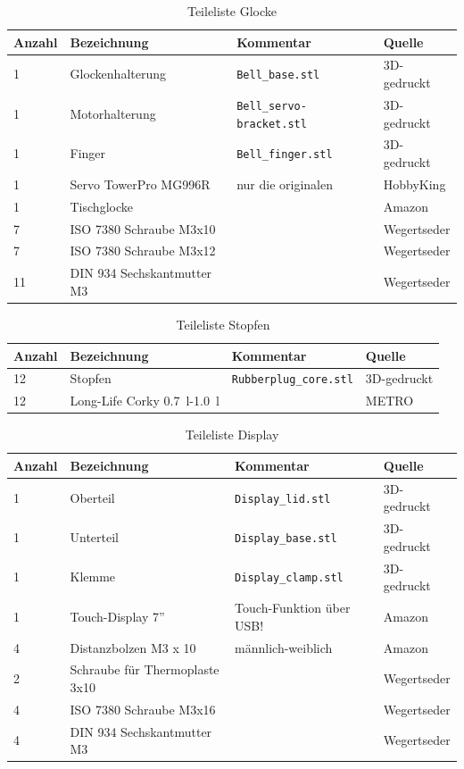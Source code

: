 \documentclass[a4paper]{scrartcl}
\begin{document}
\begin{table}
\caption{Teileliste Glocke}
\begin{tabular}{|l|l|l|l|}
\hline
Anzahl & Bezeichnung & Kommentar & Quelle\\
\hline
1 & Glockenhalterung & \texttt{Bell\_base.stl} & 3D-gedruckt\\
\hline
1 & Motorhalterung & \texttt{Bell\_servo-bracket.stl}& 3D-gedruckt\\
\hline 
1 & Finger & \texttt{Bell\_finger.stl} & 3D-gedruckt\\
\hline
1 & Servo TowerPro MG996R & nur die originalen & HobbyKing\\
\hline
1 & Tischglocke &  & Amazon \\
\hline
7 & ISO 7380 Schraube M3x10  & & Wegertseder\\
\hline
7 & ISO 7380 Schraube M3x12  & & Wegertseder\\
\hline
11 & DIN 934 Sechskantmutter M3& & Wegertseder\\
\hline 
 
\end{tabular}
\end{table}

\begin{table}
\caption{Teileliste Stopfen}
\begin{tabular}{|l|l|l|l|}
\hline
Anzahl & Bezeichnung & Kommentar & Quelle\\
\hline
12 & Stopfen & \texttt{Rubberplug\_core.stl} & 3D-gedruckt\\
\hline
12 & Long-Life Corky \SI{0.7}{\litre}-\SI{1.0}{\litre} &  & METRO\\
\hline 
\end{tabular}
\end{table}

\begin{table}
\caption{Teileliste Display}
\begin{tabular}{|l|l|l|l|}
\hline
Anzahl & Bezeichnung & Kommentar & Quelle\\
\hline 
1 & Oberteil & \texttt{Display\_lid.stl} & 3D-gedruckt \\
\hline 
1 & Unterteil & \texttt{Display\_base.stl} & 3D-gedruckt\\
\hline
1 & Klemme & \texttt{Display\_clamp.stl} & 3D-gedruckt\\
\hline
1 & Touch-Display 7'' & Touch-Funktion über USB! & Amazon\\
\hline
4 & Distanzbolzen M3 x 10 & männlich-weiblich &Amazon\\
\hline
2 & Schraube für Thermoplaste 3x10& & Wegertseder\\
\hline
4 & ISO 7380 Schraube M3x16  & & Wegertseder\\
\hline
4 & DIN 934 Sechskantmutter M3 & & Wegertseder\\
\hline 

\end{tabular}
\end{table}
\end{document}
